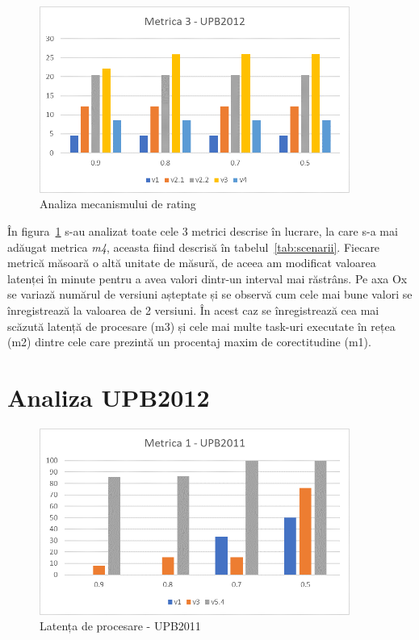 \documentclass[12pt,a4paper]{report}
\begin{document}
\begin{figure}[th]
\centering
\includegraphics[width=4in]{pics/graphics/grafic13.png}
  \caption[]{Analiza mecanismului de rating}
  \label{fig:versiuniRating}
\end{figure}
În figura~\ref{fig:versiuniRating} s-au analizat toate cele 3 metrici descrise în lucrare, la care s-a mai adăugat metrica \textit{m4}, aceasta fiind descrisă în tabelul~\ref{tab:scenarii}. Fiecare metrică măsoară o altă unitate de măsură, de aceea am modificat valoarea latenței în minute pentru a avea valori dintr-un interval mai răstrâns. Pe axa Ox se variază numărul de versiuni așteptate și se observă cum cele mai bune valori se înregistrează la valoarea de 2 versiuni. În acest caz se înregistrează cea mai scăzută latență de procesare (m3) și cele mai multe task-uri executate în rețea (m2) dintre cele care prezintă un procentaj maxim de corectitudine (m1). 

\section{Analiza UPB2012}

\iftrue
\begin{figure}[th]
\centering
\includegraphics[width=4in]{pics/graphics/grafic9.png}
  \caption[]{Latența de procesare - UPB2011}
  \label{grafic10}
\end{figure}
\fi
\end{document}
